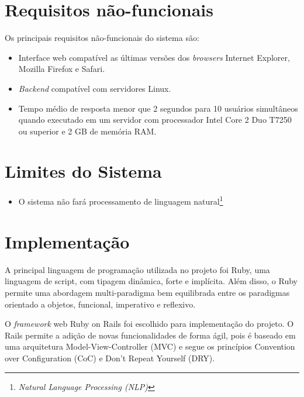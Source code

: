 \section{Requisitos não-funcionais}

Os principais requisitos não-funcionais do sistema são:

\begin{itemize}

    \item Interface web compatível as últimas versões dos \textit{browsers} Internet Explorer, Mozilla Firefox e Safari.
    
    \item \textit{Backend} compatível com servidores Linux.

    \item Tempo médio de resposta menor que 2 segundos para 10 usuários simultâneos quando executado em um servidor com processador Intel Core 2 Duo T7250 ou superior e 2 GB de memória RAM. %

\end{itemize}

\section{Limites do Sistema}

\begin{itemize}
  
    \item O sistema não fará processamento de linguagem natural\footnote{\textit{Natural Language Processing (NLP)}}

\end{itemize}

\section{Implementação} %
\label{sec:implementacao}

A principal linguagem de programação utilizada no projeto foi Ruby, uma linguagem de script, com tipagem dinâmica, forte e implícita. Além disso, o Ruby permite uma abordagem multi-paradigma bem equilibrada entre os paradigmas orientado a objetos, funcional, imperativo e reflexivo. 

O \emph{framework} web Ruby on Rails foi escolhido para implementação do projeto. O Rails permite a adição de novas funcionalidades de forma ágil, pois é baseado em uma arquitetura Model-View-Controller\cite{burbeck1992applications} (MVC) e segue os princípios Convention over Configuration\cite{hansson2006convention} (CoC) e Don't Repeat Yourself\cite{hunt-don} (DRY).


